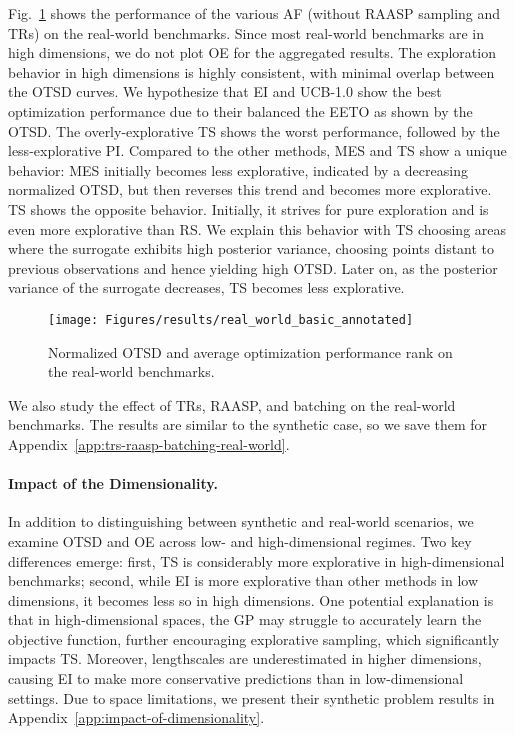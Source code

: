 \documentclass[accepted]{uai2025}
\begin{document}
Fig.~\ref{fig:rw_benchmarks_basic_af_conf} shows the performance of the various \ac{AF} (without \ac{RAASP} sampling and \acp{TR}) on the real-world benchmarks.
Since most real-world benchmarks are in high dimensions, we do not plot \ac{OE} for the aggregated results.
The exploration behavior in high dimensions is highly consistent, with minimal overlap between the OTSD curves. 
We hypothesize that \ac{EI} and \ac{UCB}-1.0 show the best optimization performance due to their balanced the \ac{EETO} as shown by the OTSD.
The overly-explorative \ac{TS} shows the worst performance, followed by the less-explorative \ac{PI}.
Compared to the other methods, \ac{MES} and \ac{TS} show a unique behavior: \ac{MES} initially becomes less explorative, indicated by a decreasing normalized \ac{OTSD}, but then reverses this trend and becomes more explorative.
\ac{TS} shows the opposite behavior.
Initially, it strives for pure exploration and is even more explorative than \ac{RS}.
We explain this behavior with \ac{TS} choosing areas where the surrogate exhibits high posterior variance, choosing points distant to previous observations and hence yielding high \ac{OTSD}.
Later on, as the posterior variance of the surrogate decreases, \ac{TS} becomes less explorative.

\begin{figure}[tb]
    \centering
    \texttt{[image: Figures/results/real\_world\_basic\_annotated]}
    \caption{Normalized \ac{OTSD} and average optimization performance rank on the real-world benchmarks.}
    \label{fig:rw_benchmarks_basic_af_conf}
\end{figure}

We also study the effect of \acp{TR}, \ac{RAASP}, and batching on the real-world benchmarks.
The results are similar to the synthetic case, so we save them for Appendix~\ref{app:trs-raasp-batching-real-world}.

\paragraph{Impact of the Dimensionality.}
In addition to distinguishing between synthetic and real-world scenarios, we examine \ac{OTSD} and \ac{OE} across low- and high-dimensional regimes. Two key differences emerge: first, \ac{TS} is considerably more explorative in high-dimensional benchmarks; second, while \ac{EI} is more explorative than other methods in low dimensions, it becomes less so in high dimensions. One potential explanation is that in high-dimensional spaces, the \ac{GP} may struggle to accurately learn the objective function, further encouraging explorative sampling, which significantly impacts \ac{TS}. Moreover, lengthscales are underestimated in higher dimensions, causing \ac{EI} to make more conservative predictions than in low-dimensional settings. Due to space limitations, we present their synthetic problem results in Appendix~\ref{app:impact-of-dimensionality}.
\end{document}
